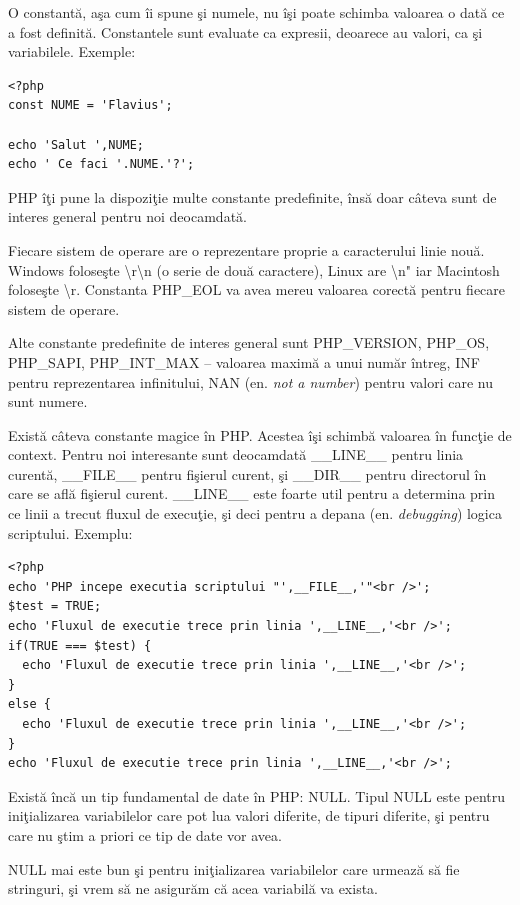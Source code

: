 O constantă, aşa cum îi spune şi numele, nu îşi poate schimba valoarea o dată
ce a fost definită. Constantele sunt evaluate ca expresii, deoarece au valori,
ca şi variabilele. Exemple:
\begin{lstlisting}
<?php
const NUME = 'Flavius';

echo 'Salut ',NUME;
echo ' Ce faci '.NUME.'?';
\end{lstlisting}

PHP îţi pune la dispoziţie multe constante predefinite, însă doar
câteva sunt de interes general
pentru noi deocamdată.

Fiecare sistem de operare  are o reprezentare proprie
a caracterului {\glqq}linie nouă{\grqq}. Windows foloseşte {\glqq}{\textbackslash}r{\textbackslash}n{\grqq} (o
serie de două caractere{\glqq}), Linux are {\grqq}{\textbackslash}n" iar Macintosh foloseşte
{\glqq}{\textbackslash}r{\grqq}. Constanta PHP\_EOL va avea mereu valoarea corectă pentru
fiecare sistem de operare.

Alte constante predefinite de interes general sunt PHP\_VERSION, PHP\_OS,
PHP\_SAPI, PHP\_INT\_MAX -- valoarea maximă a unui număr întreg, INF pentru
reprezentarea infinitului, NAN (en. \textsl{not a number}) pentru valori
care nu sunt numere.

Există câteva constante magice în PHP. Acestea îşi schimbă valoarea
în funcţie de context. Pentru noi interesante sunt deocamdată
\_\_LINE\_\_ pentru linia curentă, \_\_FILE\_\_ pentru fişierul
curent, şi \_\_DIR\_\_ pentru directorul în care se află fişierul curent.
\_\_LINE\_\_ este foarte util pentru a determina prin ce linii 
a trecut fluxul de execuţie, şi deci pentru a depana (en. \textsl{debugging})
logica scriptului. Exemplu:
\begin{lstlisting}
<?php
echo 'PHP incepe executia scriptului "',__FILE__,'"<br />';
$test = TRUE;
echo 'Fluxul de executie trece prin linia ',__LINE__,'<br />';
if(TRUE === $test) {
  echo 'Fluxul de executie trece prin linia ',__LINE__,'<br />';
}
else {
  echo 'Fluxul de executie trece prin linia ',__LINE__,'<br />';
}
echo 'Fluxul de executie trece prin linia ',__LINE__,'<br />';
\end{lstlisting}

Există încă un tip fundamental de date în PHP: NULL. Tipul NULL
este pentru iniţializarea variabilelor care pot lua valori diferite, de tipuri
diferite, şi pentru care nu ştim a priori ce tip de date vor avea.

NULL mai este bun şi pentru iniţializarea variabilelor care urmează să fie
stringuri, şi vrem să ne asigurăm că acea variabilă va exista.


